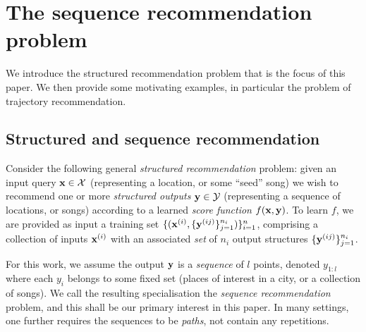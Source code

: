 
\section{The sequence recommendation problem}
\label{sec:recseq}

We introduce the structured recommendation problem that is the focus of this paper.
We then provide some motivating examples, in particular the problem of trajectory recommendation.

\subsection{Structured and sequence recommendation}
\label{sec:seqrec-defn}

Consider the following general %
\emph{structured recommendation} problem:
given an input query $\mathbf{x} \in \mathcal{X}$ (representing \eg a location, or some ``seed'' song)
we wish to recommend one or more \emph{structured outputs} $\mathbf{y} \in \mathcal{Y}$ (representing \eg a sequence of locations, or songs)
according to a learned \emph{score function} $f(\mathbf{x},\mathbf{y})$.
To learn $f$,
we are provided as input a training set
$\{ ( \mathbf{x}^{({i})}, \{ \mathbf{y}^{({ij})} \}_{j=1}^{n_i} ) \}_{i=1}^{n}$,
comprising a collection of inputs $\mathbf{x}^{({i})}$ with an associated \emph{set} of $n_i$ output structures $\{ \mathbf{y}^{({ij})} \}_{j=1}^{n_i}$.

For this work, we assume the output $\mathbf{y}$ is a \emph{sequence} of $l$ points, denoted $y_{1:l}$
where each $y_i$ belongs to some fixed set (\eg places of interest in a city, or a collection of songs).
We call the resulting specialisation the \emph{sequence recommendation} problem,
and this shall be our primary interest in this paper.
In many settings, one further requires the sequences to be \emph{paths}, \ie not contain any repetitions.

